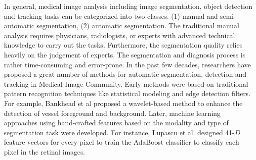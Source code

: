 \documentclass[UTF8]{article} %
\begin{document}
In general, medical image analysis including image segmentation, object detection and tracking tasks can be categorized into two classes. (1) manual and semi-automatic segmentation, (2) automatic segmentation.  The traditional manual analysis requires physicians, radiologists, or experts with advanced technical knowledge to carry out the tasks. Furthermore, the segmentation quality relies heavily on the judgement of experts. The segmentation and diagnosis process is rather time-consuming and error-prone. In the past few decades, researchers have proposed a great number of methods for automatic segmentation, detection and tracking in Medical Image Community. Early methods were based on traditional pattern recognition techniques like statistical modeling and edge detection filters. For example, Bankhead et al\cite{PeterNGT12} proposed a wavelet-based method to enhance the detection of vessel foreground and background. Later, machine learning approaches using hand-crafted features based on the modality and type of segmentation task were developed. For instance, Lupascu et al. \cite{LupascuTT10} designed 41-$D$ feature vectors for every pixel to train the AdaBoost classifier to classify each pixel in the retinal images. 
\end{document}
